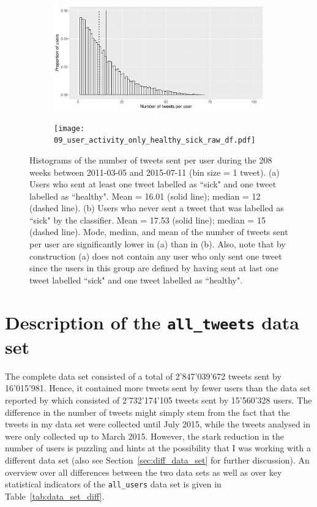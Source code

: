 \documentclass[11pt, a4paper,twoside]{report}\usepackage[]{graphicx}\usepackage[]{color}
\begin{document}
\begin{figure}[htbp!]
\centering
  \begin{subfigure}[b]{1\textwidth}
  \includegraphics[width=1\linewidth]{08_user_activity_both_sick_raw_df.pdf}
  \caption{}
  \end{subfigure}
  \begin{subfigure}[b]{1\textwidth}
  \texttt{[image: 09\_user\_activity\_only\_healthy\_sick\_raw\_df.pdf]}
  \caption{}
  \end{subfigure}
  \caption{Histograms of the number of tweets sent per user during the 208 weeks between 2011-03-05 and 2015-07-11 (bin size = 1 tweet). (a) Users who sent at least one tweet labelled as ``sick" and one tweet labelled as ``healthy".  Mean = 16.01 (solid line); median = 12 (dashed line). (b) Users who never sent a tweet that was labelled as ``sick" by the classifier.  Mean = 17.53 (solid line); median = 15 (dashed line). Mode, median, and mean of the number of tweets sent per user are significantly lower in (a) than in (b). Also, note that by construction (a) does not contain any user who only sent one tweet since the users in this group are defined by having sent at last one tweet labelled ``sick" and one tweet labelled as ``healthy".}
  \label{fig:both_vs_healthy_only_hist}

\end{figure}

\section{Description of the \texttt{all\_tweets} data set}
\label{sec:full_set}

The complete data set consisted of a total of 2'847'039'672 tweets sent by 16'015'981. Hence, it contained more tweets sent by fewer users than the data set reported by \cite{bodnar_data_2015} which consisted of 2'732'174'105 tweets sent by 15'560'328 users. The difference in the number of tweets might simply stem from the fact that the tweets in my data set were collected until July 2015, while the tweets analysed in \cite{bodnar_data_2015} were only collected up to March 2015. However, the stark reduction in the number of users is puzzling and hints at the possibility that I was working with a different data set (also see Section~\ref{sec:diff_data_set} for further discussion). An overview over all differences between the two data sets as well as over key statistical indicators of the \texttt{all\_users} data set is given in Table~\ref{tab:data_set_diff}.
\end{document}
